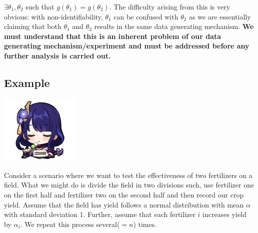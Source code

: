 \documentclass[oneside]{book}
\begin{document}
\begin{center}

    
\end{center}


$\exists \theta_1,\theta_2$ such that $g(\theta_1)=g(\theta_2)$. The difficulty arising from this is very obvious: with non-identifiability, $\theta_1$ can be confused with $\theta_2$ as we are essentially claiming that both $\theta_1$ and $\theta_2$ results in the same data generating mechanism.  \textbf{We must understand that this is an inherent problem of our data generating mechanism/experiment and must be addressed before any further analysis is carried out.} 

\subsection{Example}
\begin{marginfigure}%
    \includegraphics[width=1.5in]{chibis/file_003.png}
\end{marginfigure}%
Consider a scenario where we want to test the effectiveness of two fertilizers on a field. What we might do is divide the field in two divisions such, use fertilizer one on the first half and fertilizer two on the second half and then record our crop yield. Assume that the field has yield follows a normal distribution with mean $\alpha$ with standard deviation $1$. Further, assume that each fertilizer $i$ increases yield by $\alpha_i$. We repeat this process several($=n$) times.
\end{document}
